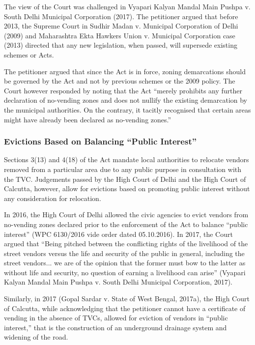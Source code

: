 \documentclass[a4paper, 12pt, twoside]{article}
\begin{document}
The view of the Court was challenged in Vyapari Kalyan Mandal Main Pushpa v. South Delhi Municipal Corporation (2017). The petitioner argued that before 2013, the Supreme Court in Sudhir Madan v. Municipal Corporation of Delhi (2009) and Maharashtra Ekta Hawkers Union v. Municipal Corporation case (2013) directed that any new legislation, when passed, will supersede existing schemes or Acts. 

The petitioner argued that since the Act is in force, zoning demarcations should be governed by the Act and not by previous schemes or the 2009 policy. The Court however responded by noting that the Act “merely prohibits any further declaration of no-vending zones and does not nullify the existing demarcation by the municipal authorities. On the contrary, it tacitly recognised that certain areas might have already been declared as no-vending zones.” 

\subsubsection{Evictions Based on Balancing “Public Interest”}

Sections 3(13) and 4(18) of the Act mandate local authorities to relocate vendors removed from a particular area due to any public purpose in consultation with the TVC. Judgements passed by the High Court of Delhi and the High Court of Calcutta, however, allow for evictions based on promoting public interest without any consideration for relocation.

In 2016, the High Court of Delhi allowed the civic agencies to evict vendors from no-vending zones declared prior to the enforcement of the Act to balance “public interest” (WPC 6130/2016 vide order dated 05.10.2016). In 2017, the Court argued that “Being pitched between the conflicting rights of the livelihood of the street vendors versus the life and security of the public in general, including the street vendors... we are of the opinion that the former must bow to the latter as without life and security, no question of earning a livelihood can arise” (Vyapari Kalyan Mandal Main Pushpa v. South Delhi Municipal Corporation, 2017).

Similarly, in 2017 (Gopal Sardar v. State of West Bengal, 2017a), the High Court of Calcutta, while acknowledging that the petitioner cannot have a certificate of vending in the absence of TVCs, allowed for eviction of vendors in “public interest,” that is the construction of an underground drainage system and widening of the road. 
\end{document}
